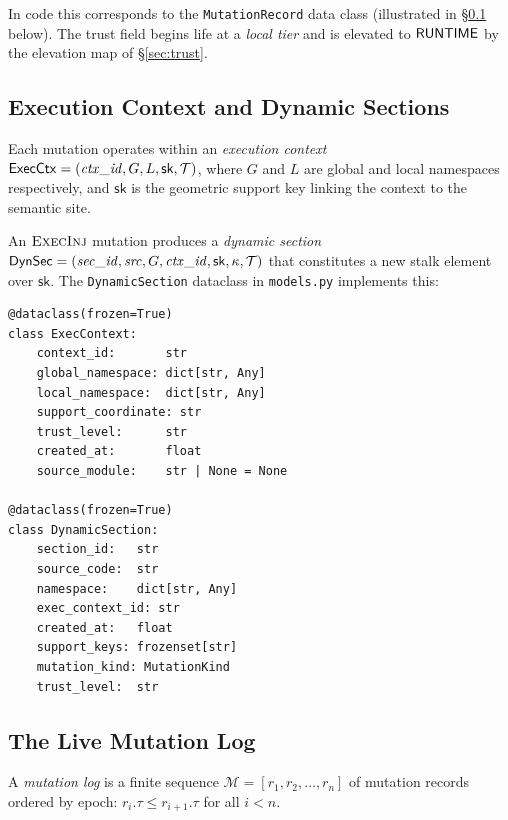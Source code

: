 \documentclass[11pt]{article}
\newcommand{\DynSec}{\mathsf{DynSec}}            %
\newcommand{\ExecCtxM}{\mathsf{ExecCtx}}         %
\newcommand{\SuppKey}{\mathsf{sk}}               %
\newcommand{\ExecInj}{\textsc{ExecInj}}          %
\newcommand{\Epoch}{\tau}                        %
\newcommand{\MutLog}{\mathcal{M}}                %
\begin{document}
In code this corresponds to the \texttt{MutationRecord} data class
(illustrated in \S\ref{subsec:exec-model} below).  The trust field
begins life at a \emph{local tier} and is elevated to $\mathsf{RUNTIME}$
by the elevation map of \S\ref{sec:trust}.

\subsection{Execution Context and Dynamic Sections}
\label{subsec:exec-model}

Each mutation operates within an \emph{execution context}
$\ExecCtxM = (\mathit{ctx\_id}, G, L, \SuppKey, \trust)$, where $G$
and $L$ are global and local namespaces respectively, and $\SuppKey$
is the geometric support key linking the context to the semantic site.

An $\ExecInj$ mutation produces a \emph{dynamic section}
$\DynSec = (\mathit{sec\_id}, \mathit{src}, G, \mathit{ctx\_id},
\SuppKey, \kappa, \trust)$ that constitutes a new stalk element over
$\SuppKey$.  The \texttt{DynamicSection} dataclass in
\texttt{models.py} implements this:

\begin{lstlisting}[style=jugeo-python,
    caption={Dynamic section and execution context (models.py, abridged)}]
@dataclass(frozen=True)
class ExecContext:
    context_id:       str
    global_namespace: dict[str, Any]
    local_namespace:  dict[str, Any]
    support_coordinate: str
    trust_level:      str
    created_at:       float
    source_module:    str | None = None

@dataclass(frozen=True)
class DynamicSection:
    section_id:   str
    source_code:  str
    namespace:    dict[str, Any]
    exec_context_id: str
    created_at:   float
    support_keys: frozenset[str]
    mutation_kind: MutationKind
    trust_level:  str
\end{lstlisting}

\subsection{The Live Mutation Log}
\label{subsec:log}

\begin{definition}
\label{def:log}
A \emph{mutation log} is a finite sequence
$\MutLog = [r_1, r_2, \ldots, r_n]$ of mutation records ordered by
epoch: $r_i.\Epoch \leq r_{i+1}.\Epoch$ for all $i < n$.
\end{definition}
\end{document}
